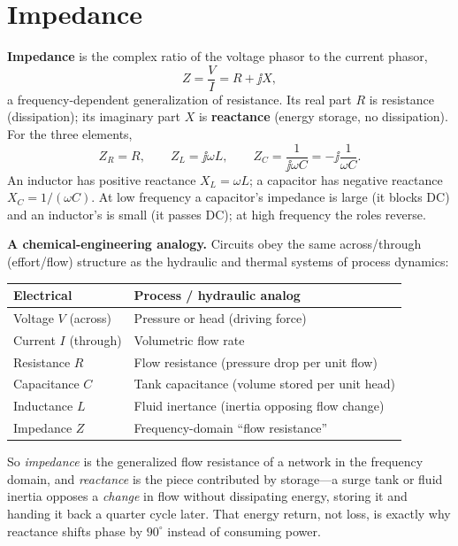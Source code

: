 \section{Impedance}
\textbf{Impedance} is the complex ratio of the voltage phasor to the current
phasor,
\[
Z=\frac{V}{I}=R+\jj X,
\]
a frequency-dependent generalization of resistance. Its real part \(R\) is
resistance (dissipation); its imaginary part \(X\) is \textbf{reactance}
(energy storage, no dissipation). For the three elements,
\[
Z_R=R,\qquad
Z_L=\jj\omega L,\qquad
Z_C=\frac{1}{\jj\omega C}=-\jj\frac{1}{\omega C}.
\]
An inductor has positive reactance \(X_L=\omega L\); a capacitor has negative
reactance \(X_C=1/(\omega C)\). At low frequency a capacitor's impedance is large
(it blocks DC) and an inductor's is small (it passes DC); at high frequency the
roles reverse.

\begin{physicalbox}
\textbf{A chemical-engineering analogy.} Circuits obey the same
across/through (effort/flow) structure as the hydraulic and thermal systems of
process dynamics:
\begin{center}
\begin{tabularx}{0.92\textwidth}{@{}L{0.26\textwidth}Y@{}}
\toprule
Electrical & Process / hydraulic analog \\
\midrule
Voltage \(V\) (across) & Pressure or head (driving force) \\
Current \(I\) (through) & Volumetric flow rate \\
Resistance \(R\) & Flow resistance (pressure drop per unit flow) \\
Capacitance \(C\) & Tank capacitance (volume stored per unit head) \\
Inductance \(L\) & Fluid inertance (inertia opposing flow change) \\
Impedance \(Z\) & Frequency-domain ``flow resistance'' \\
\bottomrule
\end{tabularx}
\end{center}
So \emph{impedance} is the generalized flow resistance of a network in the
frequency domain, and \emph{reactance} is the piece contributed by storage---a
surge tank or fluid inertia opposes a \emph{change} in flow without dissipating
energy, storing it and handing it back a quarter cycle later. That energy return,
not loss, is exactly why reactance shifts phase by \(90^\circ\) instead of
consuming power.
\end{physicalbox}

